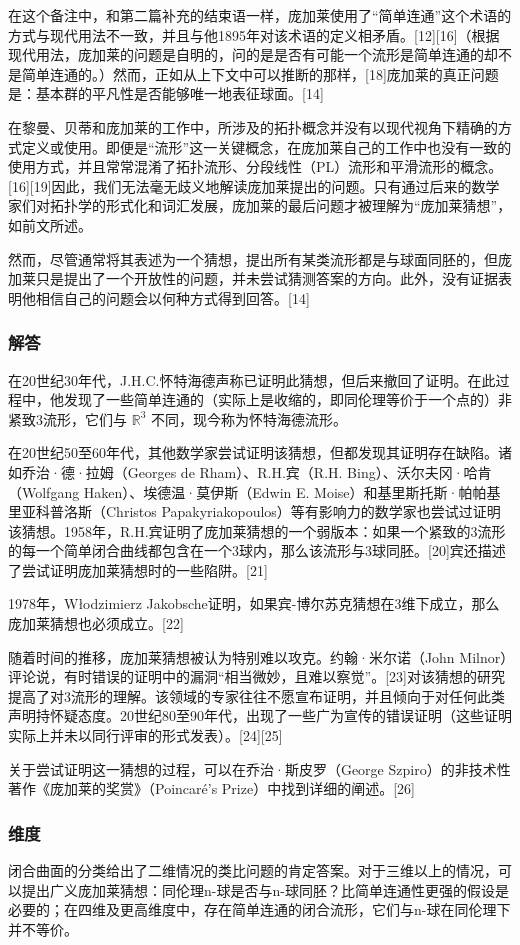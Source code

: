 在这个备注中，和第二篇补充的结束语一样，庞加莱使用了“简单连通”这个术语的方式与现代用法不一致，并且与他1895年对该术语的定义相矛盾。[12][16]（根据现代用法，庞加莱的问题是自明的，问的是是否有可能一个流形是简单连通的却不是简单连通的。）然而，正如从上下文中可以推断的那样，[18]庞加莱的真正问题是：基本群的平凡性是否能够唯一地表征球面。[14]

在黎曼、贝蒂和庞加莱的工作中，所涉及的拓扑概念并没有以现代视角下精确的方式定义或使用。即便是“流形”这一关键概念，在庞加莱自己的工作中也没有一致的使用方式，并且常常混淆了拓扑流形、分段线性（PL）流形和平滑流形的概念。[16][19]因此，我们无法毫无歧义地解读庞加莱提出的问题。只有通过后来的数学家们对拓扑学的形式化和词汇发展，庞加莱的最后问题才被理解为“庞加莱猜想”，如前文所述。

然而，尽管通常将其表述为一个猜想，提出所有某类流形都是与球面同胚的，但庞加莱只是提出了一个开放性的问题，并未尝试猜测答案的方向。此外，没有证据表明他相信自己的问题会以何种方式得到回答。[14]
\subsubsection{解答}
在20世纪30年代，J.H.C.怀特海德声称已证明此猜想，但后来撤回了证明。在此过程中，他发现了一些简单连通的（实际上是收缩的，即同伦理等价于一个点的）非紧致3流形，它们与 \(\mathbb{R}^3\) 不同，现今称为怀特海德流形。

在20世纪50至60年代，其他数学家尝试证明该猜想，但都发现其证明存在缺陷。诸如乔治·德·拉姆（Georges de Rham）、R.H.宾（R.H. Bing）、沃尔夫冈·哈肯（Wolfgang Haken）、埃德温·莫伊斯（Edwin E. Moise）和基里斯托斯·帕帕基里亚科普洛斯（Christos Papakyriakopoulos）等有影响力的数学家也尝试过证明该猜想。1958年，R.H.宾证明了庞加莱猜想的一个弱版本：如果一个紧致的3流形的每一个简单闭合曲线都包含在一个3球内，那么该流形与3球同胚。[20]宾还描述了尝试证明庞加莱猜想时的一些陷阱。[21]

1978年，Włodzimierz Jakobsche证明，如果宾-博尔苏克猜想在3维下成立，那么庞加莱猜想也必须成立。[22]

随着时间的推移，庞加莱猜想被认为特别难以攻克。约翰·米尔诺（John Milnor）评论说，有时错误的证明中的漏洞“相当微妙，且难以察觉”。[23]对该猜想的研究提高了对3流形的理解。该领域的专家往往不愿宣布证明，并且倾向于对任何此类声明持怀疑态度。20世纪80至90年代，出现了一些广为宣传的错误证明（这些证明实际上并未以同行评审的形式发表）。[24][25]

关于尝试证明这一猜想的过程，可以在乔治·斯皮罗（George Szpiro）的非技术性著作《庞加莱的奖赏》（Poincaré's Prize）中找到详细的阐述。[26]
\subsubsection{维度}
闭合曲面的分类给出了二维情况的类比问题的肯定答案。对于三维以上的情况，可以提出广义庞加莱猜想：同伦理n-球是否与n-球同胚？比简单连通性更强的假设是必要的；在四维及更高维度中，存在简单连通的闭合流形，它们与n-球在同伦理下并不等价。

